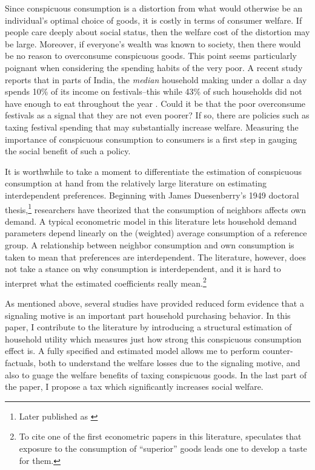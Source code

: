 \documentclass{article}
\begin{document}
Since conspicuous consumption is a distortion from what would otherwise be an individual's optimal choice of goods, it is costly in terms of consumer welfare.  If people care deeply about social status, then the welfare cost of the distortion may be large.  Moreover, if everyone's wealth was known to society, then there would be no reason to overconsume conspicuous goods.  This point seems particularly poignant when considering the spending habits of the very poor.  A recent study reports that in parts of India, the \emph{median} household making under a dollar a day spends 10\% of its income on festivals--this while 43\% of such households did not have enough to eat throughout the year \citep{BanerjeeDuflo2007}.  Could it be that the poor overconsume festivals as a signal that they are not even poorer?  If so, there are policies such as taxing festival spending that may substantially increase welfare.  Measuring the importance of conspicuous consumption to consumers is a first step in gauging the social benefit of such a policy.

It is worthwhile to take a moment to differentiate the estimation of conspicuous consumption at hand from the relatively large literature on estimating interdependent preferences.  Beginning with James Duesenberry's 1949 doctoral thesis,\footnote{Later published as \citep{Duesenberry1949}} researchers have theorized that the consumption of neighbors affects own demand.  A typical econometric model in this literature lets household demand parameters depend linearly on the (weighted) average consumption of a reference group. A relationship between neighbor consumption and own consumption is taken to mean that preferences are interdependent.  The literature, however, does not take a stance on why consumption is interdependent, and it is hard to interpret what the estimated coefficients really mean.\footnote{To cite one of the first econometric papers in this literature, \citet{Pollak1976} speculates that exposure to the consumption of ``superior'' goods leads one to develop a taste for them.}  

As mentioned above, several studies have provided reduced form evidence that a signaling motive is an important part household purchasing behavior.
In this paper, I contribute to the  literature by introducing a structural estimation of household utility which measures just how strong this conspicuous consumption effect is.
A fully specified and estimated model allows me to perform counter-factuals, both to understand the welfare losses due to the signaling motive, and also to guage the welfare benefits of taxing conspicuous goods.
In the last part of the paper, I propose a tax which significantly increases social welfare.
\end{document}
